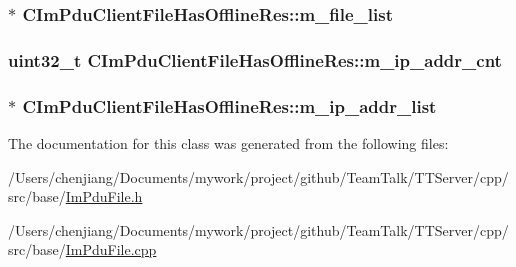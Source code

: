 \subsubsection[{m\+\_\+file\+\_\+list}]{$\ast$ C\+Im\+Pdu\+Client\+File\+Has\+Offline\+Res\+::m\+\_\+file\+\_\+list\hspace{0.3cm}{\ttfamily [private]}}\label{class_c_im_pdu_client_file_has_offline_res_a1e2afcfa4104612fae75343a6e67aa9c}
\hypertarget{class_c_im_pdu_client_file_has_offline_res_aaf5d035a2257ed8090dac3f8482ba72d}{}
\subsubsection[{m\+\_\+ip\+\_\+addr\+\_\+cnt}]{\setlength{\rightskip}{0pt plus 5cm}uint32\+\_\+t C\+Im\+Pdu\+Client\+File\+Has\+Offline\+Res\+::m\+\_\+ip\+\_\+addr\+\_\+cnt\hspace{0.3cm}{\ttfamily [private]}}\label{class_c_im_pdu_client_file_has_offline_res_aaf5d035a2257ed8090dac3f8482ba72d}
\hypertarget{class_c_im_pdu_client_file_has_offline_res_ab6f259087b0b8aa4c66e0bb2d7b5d2f5}{}
\subsubsection[{m\+\_\+ip\+\_\+addr\+\_\+list}]{$\ast$ C\+Im\+Pdu\+Client\+File\+Has\+Offline\+Res\+::m\+\_\+ip\+\_\+addr\+\_\+list\hspace{0.3cm}{\ttfamily [private]}}\label{class_c_im_pdu_client_file_has_offline_res_ab6f259087b0b8aa4c66e0bb2d7b5d2f5}


The documentation for this class was generated from the following files\+:\begin{DoxyCompactItemize}
\item 
/\+Users/chenjiang/\+Documents/mywork/project/github/\+Team\+Talk/\+T\+T\+Server/cpp/src/base/\hyperlink{_im_pdu_file_8h}{Im\+Pdu\+File.\+h}\item 
/\+Users/chenjiang/\+Documents/mywork/project/github/\+Team\+Talk/\+T\+T\+Server/cpp/src/base/\hyperlink{_im_pdu_file_8cpp}{Im\+Pdu\+File.\+cpp}\end{DoxyCompactItemize}
